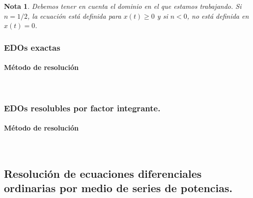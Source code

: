 \documentclass{article}
\theoremstyle{theorem-style}  %
\theoremstyle{definition-style}
\newtheorem*{note}{Nota} %
\theoremstyle{example-style}
\begin{document}
\begin{note}
	Debemos tener en cuenta el dominio en el que estamos trabajando. Si $ n=1/2 $, la ecuación está definida para $ x(t)\geq 0 $ y si $ n<0 $, no está definida en $ x(t)=0 $.
\end{note}

\subsubsection{EDOs exactas}
\paragraph{Método de resolución} \ 

\subsubsection{EDOs resolubles por factor integrante.}
\paragraph{Método de resolución} \ 


\subsection{Resolución de ecuaciones diferenciales ordinarias por medio de series de potencias.}

\pagebreak
\end{document}
